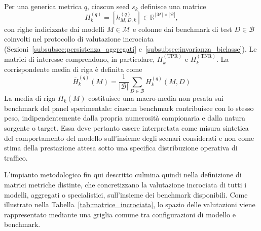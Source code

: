 Per una generica metrica $q$, ciascun seed $s_k$ definisce una matrice
\begin{equation}
    H_k^{(q)}=\left[h_{M,D,k}^{(q)}\right]\in\mathbb{R}^{|\mathcal{M}|\times|\mathcal{B}|},
\end{equation}
con righe indicizzate dai modelli $M \in \mathcal{M}$ e colonne dai benchmark di test $D \in \mathcal{B}$ coinvolti nel protocollo di valutazione incrociata (Sezioni~\ref{subsubsec:persistenza_aggregati} e~\ref{subsubsec:invarianza_biclasse}). Le matrici di interesse comprendono, in particolare, $H_k^{(\mathrm{TPR})}$ e $H_k^{(\mathrm{TNR})}$. La corrispondente media di riga è definita come
\begin{equation}
    \overline{H}_k^{(q)}(M) = \frac{1}{|\mathcal{B}|} \sum_{D \in \mathcal{B}} H_k^{(q)}(M, D)
    \label{eq:row_mean}
\end{equation}
La media di riga $\overline{H}_k(M)$ costituisce una macro-media non pesata sui benchmark del panel sperimentale: ciascun benchmark contribuisce con lo stesso peso, indipendentemente dalla propria numerosità campionaria e dalla natura sorgente o target. Essa deve pertanto essere interpretata come misura sintetica del comportamento del modello sull'insieme degli scenari considerati e non come stima della prestazione attesa sotto una specifica distribuzione operativa di traffico.

L'impianto metodologico fin qui descritto culmina quindi nella definizione di matrici metriche distinte, che concretizzano la valutazione incrociata di tutti i modelli, aggregati o specialistici, sull'insieme dei benchmark disponibili. Come illustrato nella Tabella~\ref{tab:matrice_incrociata}, lo spazio delle valutazioni viene rappresentato mediante una griglia comune tra configurazioni di modello e benchmark.


